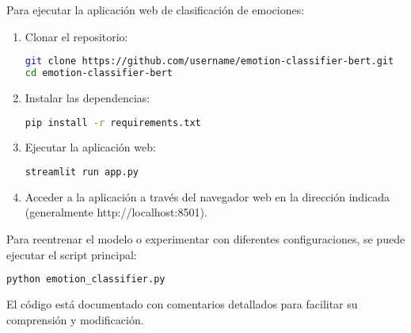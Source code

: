 \documentclass[12pt,a4paper]{report}
\begin{document}
Para ejecutar la aplicación web de clasificación de emociones:

\begin{enumerate}
  \item Clonar el repositorio:
  \begin{lstlisting}[language=bash]
git clone https://github.com/username/emotion-classifier-bert.git
cd emotion-classifier-bert\end{lstlisting}

  \item Instalar las dependencias:
  \begin{lstlisting}[language=bash]
pip install -r requirements.txt\end{lstlisting}

  \item Ejecutar la aplicación web:
  \begin{lstlisting}[language=bash]
streamlit run app.py\end{lstlisting}

  \item Acceder a la aplicación a través del navegador web en la dirección indicada (generalmente http://localhost:8501).
\end{enumerate}

Para reentrenar el modelo o experimentar con diferentes configuraciones, se puede ejecutar el script principal:

\begin{lstlisting}[language=bash]
python emotion_classifier.py
\end{lstlisting}

El código está documentado con comentarios detallados para facilitar su comprensión y modificación.
\end{document}
